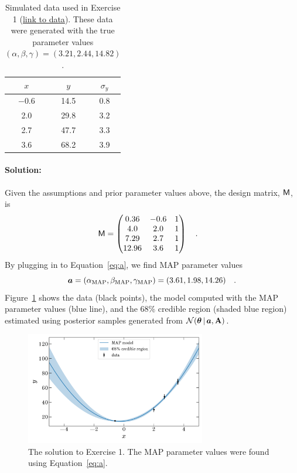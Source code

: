 \begin{table}[t!]
  \footnotesize
  \begin{center}
    \begin{tabular}{c|c|c}
      $x$ & $y$ & $\sigma_y$ \\
      \hline
      $-0.6$ & 14.5 & 0.8 \\
      2.0 & 29.8 & 3.2 \\
      2.7 & 47.7 & 3.3 \\
      3.6 & 68.2 & 3.9
    \end{tabular}
    \caption{Simulated data used in Exercise 1
    (\href{https://raw.githubusercontent.com/davidwhogg/GaussianProductRefactor/master/notebooks/data1.csv}{link to data}).
    These data were generated with the true parameter values $(\alpha, \beta, \gamma) = (3.21, 2.44, 14.82)$.
    \label{tbl:data1}}
  \end{center}
\end{table}


\paragraph{Solution:} Given the assumptions and prior parameter values
above, the design matrix, $\mathsf{M}$, is
\begin{align}
  \mathsf{M} &= \begin{pmatrix}
      0.36 & -0.6 & 1\\
      4.0 & 2.0 & 1\\
      7.29 & 2.7 & 1\\
      12.96 & 3.6 & 1
    \end{pmatrix} \quad .
\end{align}
By plugging in to Equation~\ref{eq:a}, we find MAP parameter values
\begin{equation}
  \boldsymbol{a} =
    (\alpha_{\rm MAP}, \beta_{\rm MAP}, \gamma_{\rm MAP}) =
      (3.61, 1.98, 14.26) \quad .
\end{equation}
Figure~\ref{fig:ex1} shows the data (black points), the model computed with the
MAP parameter values (blue line), and the 68\% credible region (shaded blue
region) estimated using posterior samples generated from
$\mathcal{N}\!\,(\boldsymbol{\theta}\,|\,\boldsymbol{a},\mathbf{A})$.

\begin{figure}[t]
  \centering
  \includegraphics[width=0.7\textwidth]{exercise1.pdf}
  \caption{The solution to Exercise 1. The MAP parameter values were found using
    Equation~\ref{eq:a}.}
  \label{fig:ex1}
\end{figure}



